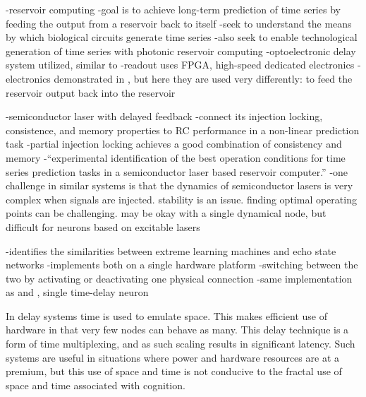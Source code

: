 \vspace{3em}
\cite{anha2017}
-reservoir computing
-goal is to achieve long-term prediction of time series by feeding the output from a reservoir back to itself
-seek to understand the means by which biological circuits generate time series
-also seek to enable technological generation of time series with photonic reservoir computing
-optoelectronic delay system utilized, similar to \cite{apso2011,padu2012,laso2012}
-readout uses FPGA, high-speed dedicated electronics
-electronics demonstrated in \cite{andu2016}, but here they are used very differently: to feed the reservoir output back into the reservoir

\vspace{3em}
\cite{cosc2018} 


\vspace{3em}
\cite{bubr2017}
-semiconductor laser with delayed feedback
-connect its injection locking, consistence, and memory properties to RC performance in a non-linear prediction task
-partial injection locking achieves a good combination of consistency and memory
-``experimental identification of the best operation conditions for time series prediction tasks in a semiconductor laser based reservoir computer.''
-one challenge in similar systems is that the dynamics of semiconductor lasers is very complex when signals are injected. stability is an issue. finding optimal operating points can be challenging. may be okay with a single dynamical node, but difficult for neurons based on excitable lasers

\vspace{3em}
\cite{orso2015}
-identifies the similarities between extreme learning machines and echo state networks
-implements both on a single hardware platform
-switching between the two by activating or deactivating one physical connection
-same implementation as \cite{padu2012} and \cite{laso2012}, single time-delay neuron

In delay systems time is used to emulate space. This makes efficient use of hardware in that very few nodes can behave as many. This delay technique is a form of time multiplexing, and as such scaling results in significant latency. Such systems are useful in situations where power and hardware resources are at a premium, but this use of space and time is not conducive to the fractal use of space and time associated with cognition.

